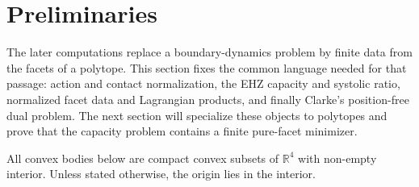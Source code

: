 \section{Preliminaries}\label{sec:preliminaries}

The later computations replace a boundary-dynamics problem by finite data from
the facets of a polytope.  This section fixes the common language needed for
that passage: action and contact normalization, the EHZ capacity and systolic
ratio, normalized facet data and Lagrangian products, and finally Clarke's
position-free dual problem.  The next section will specialize these objects to
polytopes and prove that the capacity problem contains a finite pure-facet
minimizer.

All convex bodies below are compact convex subsets of \(\mathbb{R}^4\) with
non-empty interior. Unless stated otherwise, the origin lies in the interior.







